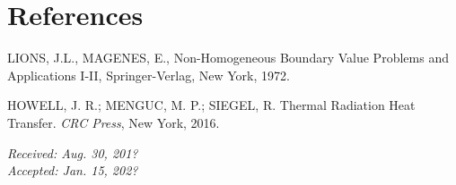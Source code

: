 \documentclass[article,10pt,twoside,a4paper,twocolumn,hidelinks,english,brazil]{abntex2}
\newcommand{\datarecebidoen}{Aug. 30, 201?} %
\newcommand{\dataaceitoen}{Jan. 15, 202?} %
\begin{document}

 

 
\section*{References}
\vspace{-1.5cm}
\renewcommand{\bibname}{}
\providecommand{\abntreprintinfo}[1]{%
 \citeonline{#1}}
\setlength{\labelsep}{0pt}
\begin{thebibliography}{}
\providecommand{\abntrefinfo}[3]{}
\providecommand{\abntbstabout}[1]{}
\abntbstabout{v-1.9.6 }





\abntrefinfo{Lions}{LIONS \textit{et al}.}{1972}
{LIONS, J.L.,  MAGENES, E.,
Non-Homogeneous Boundary Value Problems and Applications I-II,
Springer-Verlag, New York, 1972.}


\abntrefinfo{HOWELL}{HOWELL \textit{et al}.}{2016}
{HOWELL, J. R.; MENGUC, M. P.; SIEGEL, R.  Thermal Radiation Heat Transfer. \textit{CRC Press}, New York, 2016.}

 \end{thebibliography}{}  





\newpage %
\vspace*{\fill}

\begin{flushright}
    \SingleSpacing
    \textit{Received:  \datarecebidoen} \\
    \textit{Accepted:  \dataaceitoen} \\
\end{flushright}


\end{document}
